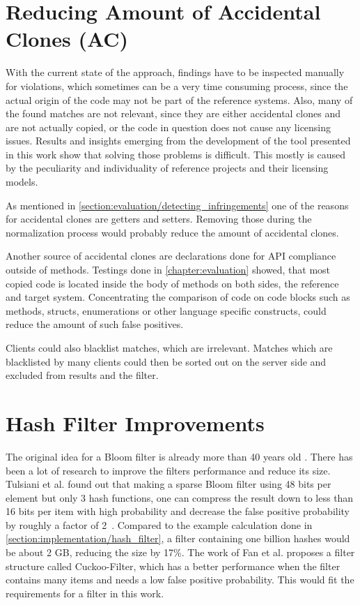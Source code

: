 \section{Reducing Amount of Accidental Clones (AC)}
With the current state of the approach, findings have to be inspected manually for violations, which sometimes can be a very time consuming process, since the actual origin of the code may not be part of the reference systems.
Also, many of the found matches are not relevant, since they are either accidental clones and are not actually copied, or the code in question does not cause any licensing issues.
Results and insights emerging from the development of the tool presented in this work show that solving those problems is difficult.
This mostly is caused by the peculiarity and individuality of reference projects and their licensing models.

As mentioned in \autoref{section:evaluation/detecting_infringements} one of the reasons for accidental clones are getters and setters.
Removing those during the normalization process would probably reduce the amount of accidental clones.

Another source of accidental clones are declarations done for API compliance outside of methods.
Testings done in \autoref{chapter:evaluation} showed, that most copied code is located inside the body of methods on both sides, the reference and target system.
Concentrating the comparison of code on code blocks such as methods, structs, enumerations or other language specific constructs, could reduce the amount of such false positives.

Clients could also blacklist matches, which are irrelevant.
Matches which are blacklisted by many clients could then be sorted out on the server side and excluded from results and the filter.

\section{Hash Filter Improvements}
The original idea for a Bloom filter is already more than 40 years old \cite{bloom1970filter}.
There has been a lot of research to improve the filters performance and reduce its size.
Tulsiani et al. found out that \glqq making a sparse Bloom filter using 48 bits per element but only 3 hash functions, one can compress the result down to less than 16 bits per item with high probability and decrease the false positive probability by roughly a factor of 2\grqq \ \cite{tulsiani2013probability}.
Compared to the example calculation done in \autoref{section:implementation/hash_filter}, a filter containing one billion hashes would be about 2 GB, reducing the size by 17\%.
The work of Fan et al. proposes a filter structure called Cuckoo-Filter, which has a better performance when the filter contains many items and needs a low false positive probability.
This would fit the requirements for a filter in this work.